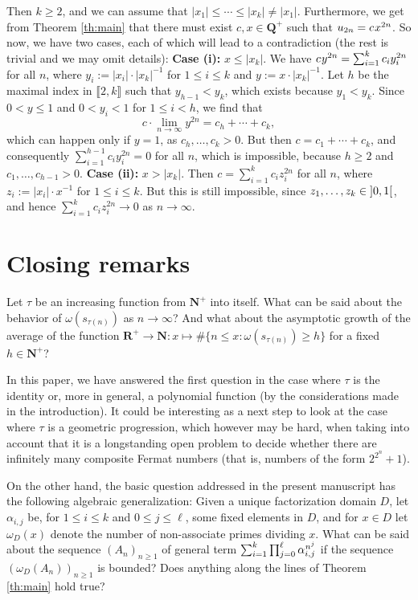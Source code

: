 \documentclass[reqno]{amsart}
\theoremstyle{remark}
\providecommand{\NNb}{\mathbf{N}}
\providecommand{\RRb}{\mathbf{R}}
\providecommand\llb{\llbracket}
\providecommand\rrb{\rrbracket}
\newcommand{\fixed}[2][1]{%
  \begingroup
  \spaceskip=#1\fontdimen2\font minus \fontdimen4\font
  \xspaceskip=0pt\relax
  #2%
  \endgroup
}
\begin{document}
Then $k \ge 2$, and we can assume that $|x_1| \le \cdots \le |x_k| \ne |x_1|$. Furthermore, we get from Theorem \ref{th:main} that there must exist $c, x \in \mathbf Q^+$ such that $u_{2n} = c \fixed[0.2]{\text{ }} x^{2n}$. So now, we have two cases, each of which will lead to a contradiction (the rest is trivial and we may omit details):
%
\vskip 0.3cm
\noindent{}\textbf{Case (i):} $x \le |x_k|$. We have $c\fixed[0.2]{\text{ }} y^{2n} = \sum_{i=1}^k c_i y_i^{2n}$ for all $n$, where $y_i := |x_i| \cdot |x_k|^{-1}$ for $1 \le i \le k$ and $y := x \cdot |x_k|^{-1}$. Let $h$ be the maximal index in $\llb 2, k \rrb$ such that $y_{h-1} < y_k$, which exists because $y_1 < y_k$. Since $0 < y \le 1$ and $0 < y_i < 1$ for $1 \le i < h$, we find that
$$
c \cdot \lim_{n \to \infty} y^{2n} = c_h + \cdots + c_k,
$$
which can happen only if $y = 1$, as $c_h, \ldots, c_k > 0$. But then $c = c_1 + \cdots + c_k$, and consequently $\sum_{i=1}^{h-1} c_i y_i^{2n} = 0$ for all $n$, which is impossible, because $h \ge 2$ and $c_1, \ldots, c_{h-1} > 0$.
%
\vskip 0.3cm
\noindent{}\textbf{Case (ii):} $x > |x_k|$. Then $c = \sum_{i=1}^k c_i z_i^{2n}$ for all $n$, where $z_i := |x_i| \cdot x^{-1}$ for $1 \le i \le k$. But this is still impossible, since $z_1, \ldots, z_k \in {]0,1[}\fixed[0.15]{\text{ }}$, and hence $\sum_{i=1}^k c_i z_i^{2n} \to 0$ as $n \to \infty$.
%
\section{Closing remarks}
\label{sec:closings}
%
Let $\tau$ be an increasing function from $\NNb^+$ into itself. What can be said about the behavior of $\omega(s_{\tau(n)})$ as $n \to \infty$?
And what about the asymptotic growth of the average of the function $\RRb^+ \to \NNb: x \mapsto \#\{n \le x: \omega(s_{\tau(n)}) \ge h\}$ for a fixed $h \in \NNb^+$?

In this paper, we have answered the first question in the case where $\tau$ is the identity or, more in general, a polynomial function (by the considerations made in the introduction). It could be interesting as a next step to look at the case where $\tau$ is a geometric progression, which however may be hard, when taking into account that it is a longstanding open problem to decide whether there are infinitely many composite Fermat numbers (that is, numbers of the form $2^{2^n} + 1$).

On the other hand, the basic question addressed in the present manuscript has
the following algebraic generalization:
Given a unique factorization domain $D$, let $\alpha_{i,j}$ be, for $1 \le i \le k$ and $0 \le j \le \ell$, some fixed elements in $D$, and for $x \in D$ let $\omega_D(x)$ denote the number of non-associate primes dividing $x$. What can be said about the sequence $(A_n)_{n \ge 1}$ of general term
$
\sum_{i=1}^k \prod_{j=0}^\ell \alpha_{i,j}^{\fixed[0.1]{\text{ }} n^j}
$
if the sequence $(\omega_D(A_n))_{n \ge 1}$ is bounded? Does anything along the lines of Theorem \ref{th:main} hold true?
%
\end{document}
